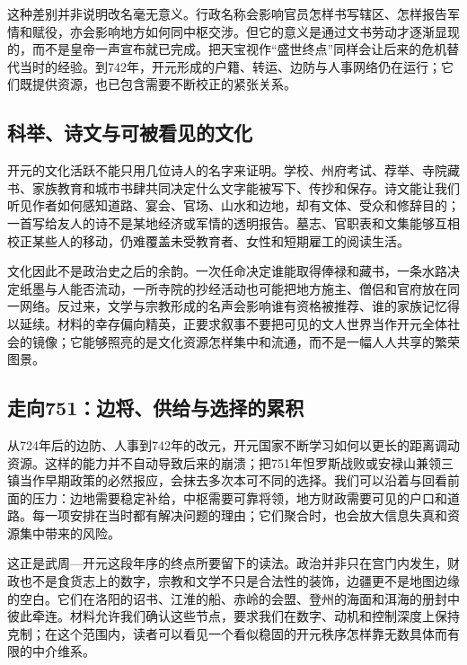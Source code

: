 这种差别并非说明改名毫无意义。行政名称会影响官员怎样书写辖区、怎样报告军情和赋役，亦会影响地方如何同中枢交涉。但它的意义是通过文书劳动才逐渐显现的，而不是皇帝一声宣布就已完成。把天宝视作“盛世终点”同样会让后来的危机替代当时的经验。到742年，开元形成的户籍、转运、边防与人事网络仍在运行；它们既提供资源，也已包含需要不断校正的紧张关系。

\subsection{科举、诗文与可被看见的文化}
开元的文化活跃不能只用几位诗人的名字来证明。学校、州府考试、荐举、寺院藏书、家族教育和城市书肆共同决定什么文字能被写下、传抄和保存。诗文能让我们听见作者如何感知道路、宴会、官场、山水和边地，却有文体、受众和修辞目的；一首写给友人的诗不是某地经济或军情的透明报告。墓志、官职表和文集能够互相校正某些人的移动，仍难覆盖未受教育者、女性和短期雇工的阅读生活。

文化因此不是政治史之后的余韵。一次任命决定谁能取得俸禄和藏书，一条水路决定纸墨与人能否流动，一所寺院的抄经活动也可能把地方施主、僧侣和官府放在同一网络。反过来，文学与宗教形成的名声会影响谁有资格被推荐、谁的家族记忆得以延续。材料的幸存偏向精英，正要求叙事不要把可见的文人世界当作开元全体社会的镜像；它能够照亮的是文化资源怎样集中和流通，而不是一幅人人共享的繁荣图景。

\subsection{走向751：边将、供给与选择的累积}
从724年后的边防、人事到742年的改元，开元国家不断学习如何以更长的距离调动资源。这样的能力并不自动导致后来的崩溃；把751年怛罗斯战败或安禄山兼领三镇当作早期政策的必然报应，会抹去多次本可不同的选择。我们可以沿着与回看前面的压力：边地需要稳定补给，中枢需要可靠将领，地方财政需要可见的户口和道路。每一项安排在当时都有解决问题的理由；它们聚合时，也会放大信息失真和资源集中带来的风险。

这正是武周—开元这段年序的终点所要留下的读法。政治并非只在宫门内发生，财政也不是食货志上的数字，宗教和文学不只是合法性的装饰，边疆更不是地图边缘的空白。它们在洛阳的诏书、江淮的船、赤岭的会盟、登州的海面和洱海的册封中彼此牵连。材料允许我们确认这些节点，要求我们在数字、动机和控制深度上保持克制；在这个范围内，读者可以看见一个看似稳固的开元秩序怎样靠无数具体而有限的中介维系。
